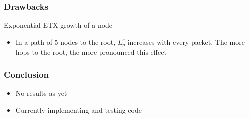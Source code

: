 \documentclass{beamer}
\begin{document}
\begin{frame}
  \frametitle{Drawbacks}
    Exponential ETX growth of a node
  \begin{itemize}
    \item In a path of 5 nodes to the root, $L_p^s$ increases with every packet.
    The more hops to the root, the more pronounced this effect
  \end{itemize}
\end{frame}  


\begin{frame}
  \frametitle{Conclusion}
  \begin{itemize}
    \item No results as yet
    \item Currently implementing and testing code
  \end{itemize}
\end{frame}  
\end{document}
